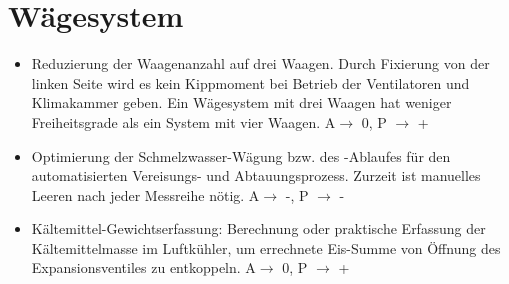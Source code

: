 \section*{Wägesystem}

\begin{itemize}
\item Reduzierung der Waagenanzahl  auf drei Waagen. Durch Fixierung von der linken Seite wird es kein Kippmoment bei Betrieb der Ventilatoren und Klimakammer geben. Ein Wägesystem mit drei Waagen hat weniger Freiheitsgrade als ein System mit vier Waagen. A$\rightarrow$ 0, P $\rightarrow$ +
\item Optimierung der Schmelzwasser-Wägung bzw. des -Ablaufes für den automatisierten Vereisungs- und Abtauungsprozess. Zurzeit ist manuelles Leeren nach jeder Messreihe nötig. A$\rightarrow$ -, P $\rightarrow$ -
\item  Kältemittel-Gewichtserfassung: Berechnung oder praktische Erfassung der Kältemittelmasse im Luftkühler, um errechnete Eis-Summe von Öffnung des Expansionsventiles zu entkoppeln. A$\rightarrow$ 0, P $\rightarrow$ +
\end{itemize}